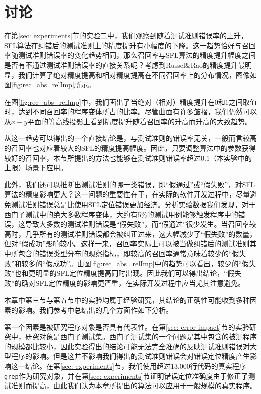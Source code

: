 \section{讨论}
在第\ref{sec: experiments}节的实验二中，我们观察到随着测试准则错误率的上升，SFL算法在纠错后的测试准则上的精度提升有小幅度的下降。这一趋势恰好与召回率随测试准则错误率的变化趋势相同，那么召回率与SFL算法的精度提升幅度之间是否有不通过测试准则错误率的直接关系呢？考虑到Russel\&Rao的精度提升最明显，我们计算了绝对精度提高和相对精度提高在不同召回率上的分布情况，图像如图\ref{fig:rec_abs_relImp}所示。

在图\ref{fig:rec_abs_relImp}中，我们画出了当绝对（相对）精度提升在$0$和$1$之间取值时，达到不同召回率的程序变体所占的比率。尽管曲面有许多皱褶，我们仍然可以从$x-y$平面的等高线投影上看到精度提升随着召回率的升高而升高的大致趋势。

从这一趋势可以得出的一个直接结论是，与测试准则的错误率无关，一般而言较高的召回率也对应着较大的SFL的精度提高幅度。因此，只要调整算法中的参数获得较好的召回率，本节所提出的方法也能够在测试准则错误率超过$0.1$（本实验中的上限）场景下应用。

此外，我们还可以推断出测试准则的哪一类错误，即“假通过”或“假失败”，对SFL算法的精度影响更大？这一问题的重要性在于，在实际的软件开发过程中，尽量避免测试准则错误总是比使用SFL定位错误更加经济。分析实验数据我们发现，对于西门子测试中的绝大多数程序变体，大约有5\%的测试用例能够触发程序中的错误，这导致大多数的测试准则错误是“假失败”，而“假通过”很少发生。当召回率较高时，几乎所有的测试准则错误都会被纠正过来，这大幅减少了“假失败”的数量，但对“假成功”影响较小。这样一来，召回率实际上可以被当做纠错后的测试准则其中所包含的错误类型分布的观察指标，即较高的召回率通常意味着较少的“假失败”和较多的“假成功”。由图\ref{fig:rec_abs_relImp}中的趋势可以看出，较少的“假失败”也和更明显的SFL定位精度提高同时出现。因此我们可以得出结论，“假失败”的确对SFL定位精度的影响更严重，在实际开发过程中应当尤其注意避免。




本章中第三节与第五节中的实验均属于经验研究，其结论的正确性可能收到多种因素的影响。我们参考\cite{Steimann:2013:TVV:2483760.2483767}中总结出的几个方面作如下分析。

第一个因素是被研究程序对象是否具有代表性。在第\ref{sec: error impact}节的实验研究中，研究对象是西门子测试集。西门子测试集的一个问题是其中包含的被测程序的规模都比较小，因此实验得出的结论可能无法完全准确的反映测试准则错误对大型程序的影响。但是这并不影响我们得出的测试准则错误会对错误定位精度产生影响这一结论。在第\ref{sec: experiments}节，我们使用超过13,000行代码的真实程序\texttt{grep}作为研究对象，并在第\ref{sec: experiments}节证明错误定位准确度由于修正了测试准则而提高，由此我们认为本章所提出的算法可以应用于一般规模的真实程序。

